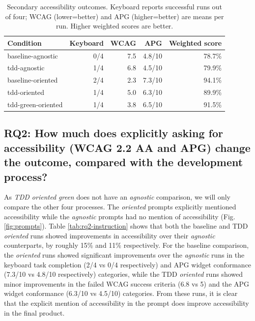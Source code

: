 \documentclass[conference]{IEEEtran}
\begin{document}
\begin{table}[H]
  \centering
  \caption{Secondary accessibility outcomes. Keyboard reports successful runs out of four; WCAG (lower=better) and APG (higher=better) are means per run. Higher weighted scores are better.}
  \label{tab:rq1}
  \footnotesize
  \begin{tabularx}{\columnwidth}{X r r r r}
    \hline
    \textbf{Condition} & \textbf{Keyboard} & \textbf{WCAG} & \textbf{APG} & \textbf{Weighted score} \\
    \hline
    baseline-agnostic & 0/4 & 7.5 & 4.8/10 & 78.7\% \\
    tdd-agnostic & 1/4 & 6.8 & 4.5/10 & 79.9\% \\
    baseline-oriented & 2/4 & 2.3 & 7.3/10 & 94.1\% \\
    tdd-oriented & 1/4 & 5.0 & 6.3/10 & 89.9\% \\
    tdd-green-oriented & 1/4 & 3.8 & 6.5/10 & 91.5\% \\
    \hline
  \end{tabularx}
\end{table}
\FloatBarrier

\subsection{RQ2: How much does explicitly asking for accessibility (WCAG 2.2 AA and APG) change the outcome, compared with the development process?}

As \textit{TDD oriented green} does not have an \textit{agnostic} comparison, we will only compare the other four processes. 
The \textit{oriented} prompts explicitly mentioned accessibility while the \textit{agnostic} prompts had no mention of accessibility 
(Fig. \ref{fig:prompts}). Table \ref{tab:rq2-instruction} shows that both the baseline and TDD \textit{oriented} runs showed improvements in accessibility over their 
\textit{agnostic} counterparts, by roughly 15\% and 11\% respectively. For the baseline comparison, the \textit{oriented} runs showed 
significant improvements over the \textit{agnostic} runs in the keyboard task completion (2/4 vs 0/4 respectively) and APG widget 
conformance (7.3/10 vs 4.8/10 respectively) categories, while the TDD \textit{oriented} runs showed minor improvements in the failed 
WCAG success criteria (6.8 vs 5) and the APG widget conformance (6.3/10 vs 4.5/10) categories. From these runs, it is clear that the 
explicit mention of accessibility in the prompt does improve accessibility in the final product. 
\end{document}
